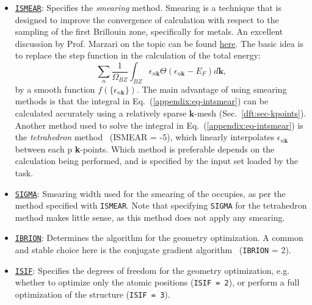 \begin{refsection}
\begin{itemize}
 \label{appendix:sec-ISMEAR} 
\item \href{https://cms.mpi.univie.ac.at/wiki/index.php/ISMEAR}{\texttt{ISMEAR}}: 
Specifies the \textit{smearing} method. Smearing is a technique that is designed 
to improve the convergence of calculation with respect to the sampling of the 
first Brillouin zone, specifically for metals. An excellent discussion by Prof. 
Marzari on the topic can be found 
\href{http://theossrv1.epfl.ch/Main/ElectronicTemperature}{here}. The basic idea 
is to replace the step function in the calculation of the total energy: 
\begin{equation}\label{appendix:eq-intsmear} 
\sum_n \frac{1}{\Omega_{BZ}}\int_{BZ} \epsilon_{n\mathbf{k}} 
\Theta(\epsilon_{n\mathbf{k}} - E_F) d\mathbf{k}, 
\end{equation} 
by a smooth function $f(\{\epsilon_{n\mathbf{k}}\})$. The main advantage of 
using smearing methods is that the integral in Eq.~(\ref{appendix:eq-intsmear}) can be 
calculated accurately using a relatively sparse $\mathbf{k}$-mesh 
(Sec.~\ref{dft:sec-kpoints}). Another method used to solve the integral in 
Eq.~(\ref{appendix:eq-intsmear}) is the \textit{tetrahedron} method~\cite{Blochl1994a} 
(ISMEAR = -5), which linearly interpolates $\epsilon_{n\mathbf{k}}$ between 
each p \textbf{k}-points. Which method is preferable depends on the calculation 
being performed, and is specified by the input set loaded by the 
 task.
 
 \label{appendix:sec-SIGMA} 
\item \href{https://cms.mpi.univie.ac.at/wiki/index.php/SIGMA}{\texttt{SIGMA}}: 
Smearing width used for the smearing of the occupies, as per the method 
specified with \texttt{ISMEAR}. Note that specifying \texttt{SIGMA} for 
the tetrahedron method makes little sense, as this method does not apply any 
smearing.

 \label{appendix:sec-IBRION} 
\item \href{https://cms.mpi.univie.ac.at/wiki/index.php/ISIF}{\texttt{IBRION}}: 
Determines the algorithm for the geometry optimization. A common and stable 
choice here is the conjugate gradient algorithm~\cite{Press2007} (\texttt{IBRION} = 2). 

 \label{appendix:sec-ISIF} 
\item \href{https://cms.mpi.univie.ac.at/wiki/index.php/ISIF}{\texttt{ISIF}}: 
Specifies the degrees of freedom for the geometry optimization, e.g. whether to 
optimize only the atomic positions (\texttt{ISIF = 2}), or perform a full 
optimization of the structure (\texttt{ISIF = 3}).


\end{itemize}
\end{refsection}
